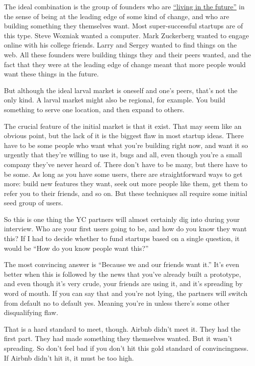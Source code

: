 The ideal combination is the group of founders who are
\href{startupideas.html}{``living in the future''} in the sense of being
at the leading edge of some kind of change, and who are building
something they themselves want. Most super-successful startups are of
this type. Steve Wozniak wanted a computer. Mark Zuckerberg wanted to
engage online with his college friends. Larry and Sergey wanted to find
things on the web. All these founders were building things they and
their peers wanted, and the fact that they were at the leading edge of
change meant that more people would want these things in the future.

But although the ideal larval market is oneself and one's peers, that's
not the only kind. A larval market might also be regional, for example.
You build something to serve one location, and then expand to others.

The crucial feature of the initial market is that it exist. That may
seem like an obvious point, but the lack of it is the biggest flaw in
most startup ideas. There have to be some people who want what you're
building right now, and want it so urgently that they're willing to use
it, bugs and all, even though you're a small company they've never heard
of. There don't have to be many, but there have to be some. As long as
you have some users, there are straightforward ways to get more: build
new features they want, seek out more people like them, get them to
refer you to their friends, and so on. But these techniques all require
some initial seed group of users.

So this is one thing the YC partners will almost certainly dig into
during your interview. Who are your first users going to be, and how do
you know they want this? If I had to decide whether to fund startups
based on a single question, it would be ``How do you know people want
this?''

The most convincing answer is ``Because we and our friends want it.''
It's even better when this is followed by the news that you've already
built a prototype, and even though it's very crude, your friends are
using it, and it's spreading by word of mouth. If you can say that and
you're not lying, the partners will switch from default no to default
yes. Meaning you're in unless there's some other disqualifying flaw.

That is a hard standard to meet, though. Airbnb didn't meet it. They had
the first part. They had made something they themselves wanted. But it
wasn't spreading. So don't feel bad if you don't hit this gold standard
of convincingness. If Airbnb didn't hit it, it must be too high.

